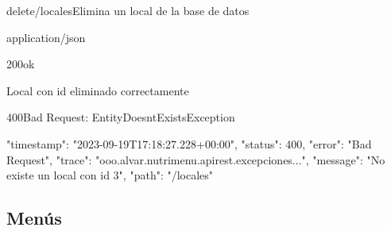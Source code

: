 \begin{apiRoute}{delete}{/locales}{Elimina un local de la base de datos}
	\begin{routeParameter}
	\end{routeParameter}
	\begin{routeResponse}{application/json}
		\begin{routeResponseItem}{200}{ok}
			\begin{routeResponseItemBody}
Local con id eliminado correctamente	
			\end{routeResponseItemBody}
		\end{routeResponseItem}
		
\begin{routeResponseItem}{400}{Bad Request: EntityDoesntExistsException}
			\begin{routeResponseItemBody}
{
    "timestamp": "2023-09-19T17:18:27.228+00:00",
    "status": 400,
    "error": "Bad Request",
    "trace": "ooo.alvar.nutrimenu.apirest.excepciones...",
    "message": "No existe un local con id 3",
    "path": "/locales"
}
			\end{routeResponseItemBody}
		\end{routeResponseItem}
		
	\end{routeResponse}
\end{apiRoute}

\subsection{Menús}

